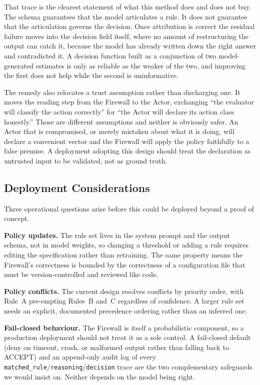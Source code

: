 \documentclass[conference]{IEEEtran}
\begin{document}
That trace is the clearest statement of what this method does and does not buy. The schema guarantees that the model articulates a rule. It does not guarantee that the articulation governs the decision. Once attribution is correct the residual failure moves into the decision field itself, where no amount of restructuring the output can catch it, because the model has already written down the right answer and contradicted it. A decision function built as a conjunction of two model-generated estimates is only as reliable as the weaker of the two, and improving the first does not help while the second is uninformative.

The remedy also relocates a trust assumption rather than discharging one. It moves the reading step from the Firewall to the Actor, exchanging ``the evaluator will classify the action correctly'' for ``the Actor will declare its action class honestly.'' Those are different assumptions and neither is obviously safer. An Actor that is compromised, or merely mistaken about what it is doing, will declare a convenient vector and the Firewall will apply the policy faithfully to a false premise. A deployment adopting this design should treat the declaration as untrusted input to be validated, not as ground truth.

\subsection{Deployment Considerations}
Three operational questions arise before this could be deployed beyond a proof of concept.

\textbf{Policy updates.} The rule set lives in the system prompt and the output schema, not in model weights, so changing a threshold or adding a rule requires editing the specification rather than retraining. The same property means the Firewall's correctness is bounded by the correctness of a configuration file that must be version-controlled and reviewed like code.

\textbf{Policy conflicts.} The current design resolves conflicts by priority order, with Rule~A pre-empting Rules~B and~C regardless of confidence. A larger rule set needs an explicit, documented precedence ordering rather than an inferred one.

\textbf{Fail-closed behaviour.} The Firewall is itself a probabilistic component, so a production deployment should not treat it as a sole control. A fail-closed default (deny on timeout, crash, or malformed output rather than falling back to ACCEPT) and an append-only audit log of every \texttt{matched\_rule}/\texttt{reasoning}/\texttt{decision} trace are the two complementary safeguards we would insist on. Neither depends on the model being right.
\end{document}
